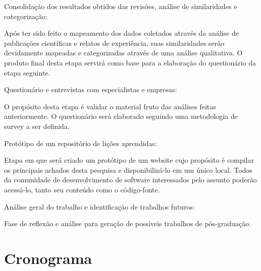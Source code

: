 \documentclass[a4paper,11pt]{article}
\newcounter{contadorDeEtapas}
\begin{document}
\begin{list}{\bfseries{}E -~}{\bfseries}
		\item Consolidação dos resultados obtidos das revisões, análise de similaridades e categorização:

			\textnormal{Após ter sido feito o mapeamento dos dados coletados através da análise de publicações científicas e relatos de experiência, suas similaridades serão devidamente mapeadas e categorizadas através de uma análise qualitativa. O produto final desta etapa servirá como base para a elaboração do questionário da etapa seguinte.}

		\item Questionário e entrevistas com especialistas e empresas:

			\textnormal{O propósito desta etapa é validar o material fruto das análises feitas anteriormente. O questionário será elaborado seguindo uma metodologia de survey a ser definida.}

		\item Protótipo de um repositório de lições aprendidas:

			\textnormal{Etapa em que será criado um protótipo de um website cujo propósito é compilar os principais achados desta pesquisa e disponibilizá-lo em um único local. Todos da comunidade de desenvolvimento de software interessados pelo assunto poderão acessá-lo, tanto seu conteúdo como o código-fonte.}

		\item Análise geral do trabalho e identificação de trabalhos futuros:

			\textnormal{Fase de reflexão e análise para geração de possíveis trabalhos de pós-graduação.}

\end{list}

\section{Cronograma}
\end{document}
